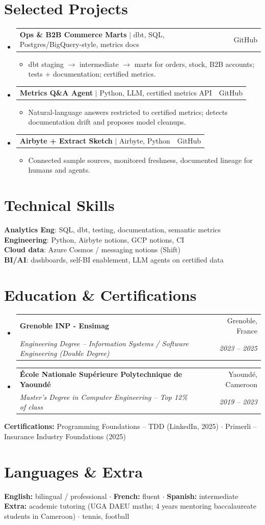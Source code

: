 \documentclass[letterpaper,10.5pt]{article}
\makeatletter
\newcommand{\resumeItem}[1]{\item\small{#1 \vspace{-1.5pt}}}
\newcommand{\resumeSubheading}[4]{
  \vspace{-1pt}\item
    \begin{tabular*}{0.97\textwidth}[t]{l@{\extracolsep{\fill}}r}
      \textbf{#1} & #2 \\
      \textit{\small#3} & \textit{\small #4} \\
    \end{tabular*}\vspace{-5pt}
}
\newcommand{\resumeProjectHeading}[2]{
    \item
    \begin{tabular*}{0.97\textwidth}{l@{\extracolsep{\fill}}r}
      \small#1 & #2 \\
    \end{tabular*}\vspace{-5pt}
}
\newcommand{\resumeSubHeadingListStart}{\begin{itemize}[leftmargin=0.15in, label={}]}
\newcommand{\resumeSubHeadingListEnd}{\end{itemize}}
\newcommand{\resumeItemListStart}{\begin{itemize}[leftmargin=0.18in]}
\newcommand{\resumeItemListEnd}{\end{itemize}\vspace{-3pt}}
\makeatother
\begin{document}
\section{Selected Projects}

\resumeSubHeadingListStart

  \resumeProjectHeading
    {\textbf{Ops \& B2B Commerce Marts} $|$ dbt, SQL, Postgres/BigQuery-style, metrics docs}{GitHub}
    \resumeItemListStart
      \resumeItem{dbt staging $\rightarrow$ intermediate $\rightarrow$ marts for orders, stock, B2B accounts; tests + documentation; certified metrics.}
    \resumeItemListEnd
  \resumeProjectHeading
    {\textbf{Metrics Q\&A Agent} $|$ Python, LLM, certified metrics API}{GitHub}
    \resumeItemListStart
      \resumeItem{Natural-language answers restricted to certified metrics; detects documentation drift and proposes model cleanups.}
    \resumeItemListEnd
  \resumeProjectHeading
    {\textbf{Airbyte + Extract Sketch} $|$ Airbyte, Python}{GitHub}
    \resumeItemListStart
      \resumeItem{Connected sample sources, monitored freshness, documented lineage for humans and agents.}
    \resumeItemListEnd
\resumeSubHeadingListEnd

\section{Technical Skills}

\begin{itemize}[leftmargin=0.15in, label={}]
  \small{\item{
\textbf{Analytics Eng}: SQL, dbt, testing, documentation, semantic metrics \\
\textbf{Engineering}: Python, Airbyte notions, GCP notions, CI \\
\textbf{Cloud data}: Azure Cosmos / messaging notions (Shift) \\
\textbf{BI/AI}: dashboards, self-BI enablement, LLM agents on certified data
  }}
\end{itemize}

\section{Education \& Certifications}

\resumeSubHeadingListStart
  \resumeSubheading
    {Grenoble INP - Ensimag}{Grenoble, France}
    {Engineering Degree -- Information Systems / Software Engineering (Double Degree)}{2023 -- 2025}
  \resumeSubheading
    {\'Ecole Nationale Sup\'erieure Polytechnique de Yaound\'e}{Yaound\'e, Cameroon}
    {Master's Degree in Computer Engineering -- Top 12\% of class}{2019 -- 2023}
\resumeSubHeadingListEnd
\small{
\textbf{Certifications:} Programming Foundations -- TDD (LinkedIn, 2025) $\cdot$ Primerli -- Insurance Industry Foundations (2025)
}

\section{Languages \& Extra}
\small{
\textbf{English:} bilingual / professional $\cdot$ \textbf{French:} fluent $\cdot$ \textbf{Spanish:} intermediate \\
\textbf{Extra:} academic tutoring (UGA DAEU maths; 4 years mentoring baccalaureate students in Cameroon) $\cdot$ tennis, football
}
\end{document}
